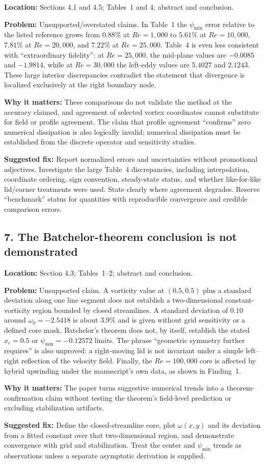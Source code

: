 \documentclass[11pt]{article}
\newcommand{\location}[1]{\textbf{Location:} #1\par}
\newcommand{\problem}[1]{\textbf{Problem:} #1\par}
\newcommand{\impact}[1]{\textbf{Why it matters:} #1\par}
\newcommand{\fixit}[1]{\textbf{Suggested fix:} #1\par}
\begin{document}
\location{Sections 4.1 and 4.5; Tables~1 and 4; abstract and conclusion.}
\problem{Unsupported/overstated claims.  In Table~1 the $\psi_{\min}$ error relative to the listed reference grows from $0.88\%$ at $Re=1{,}000$ to $5.61\%$ at $Re=10{,}000$, $7.81\%$ at $Re=20{,}000$, and $7.22\%$ at $Re=25{,}000$.  Table~4 is even less consistent with ``extraordinary fidelity'': at $Re=25{,}000$, the mid-plane values are $-0.0085$ and $-1.9814$, while at $Re=30{,}000$ the left-eddy values are $5.4027$ and $2.1243$.  These large interior discrepancies contradict the statement that divergence is localized exclusively at the right boundary node.}
\impact{These comparisons do not validate the method at the accuracy claimed, and agreement of selected vortex coordinates cannot substitute for field or profile agreement.  The claim that profile agreement ``confirms'' zero numerical dissipation is also logically invalid; numerical dissipation must be established from the discrete operator and sensitivity studies.}
\fixit{Report normalized errors and uncertainties without promotional adjectives.  Investigate the large Table~4 discrepancies, including interpolation, coordinate ordering, sign convention, steady-state status, and whether like-for-like lid/corner treatments were used.  State clearly where agreement degrades.  Reserve ``benchmark'' status for quantities with reproducible convergence and credible comparison errors.}

\subsection*{7. The Batchelor-theorem conclusion is not demonstrated}

\location{Section 4.3; Tables~1--2; abstract and conclusion.}
\problem{Unsupported claim.  A vorticity value at $(0.5,0.5)$ plus a standard deviation along one line segment does not establish a two-dimensional constant-vorticity region bounded by closed streamlines.  A standard deviation of $0.10$ around $\omega_0=-2.5418$ is about $3.9\%$ and is given without grid sensitivity or a defined core mask.  Batchelor's theorem does not, by itself, establish the stated $x_c=0.5$ or $\psi_{\min}=-0.12572$ limits.  The phrase ``geometric symmetry further requires'' is also unproved: a right-moving lid is not invariant under a simple left--right reflection of the velocity field.  Finally, the $Re=100{,}000$ core is affected by hybrid upwinding under the manuscript's own data, as shown in Finding~1.}
\impact{The paper turns suggestive numerical trends into a theorem-confirmation claim without testing the theorem's field-level prediction or excluding stabilization artifacts.}
\fixit{Define the closed-streamline core, plot $\omega(x,y)$ and its deviation from a fitted constant over that two-dimensional region, and demonstrate convergence with grid and stabilization.  Treat the center and $\psi_{\min}$ trends as observations unless a separate asymptotic derivation is supplied.}
\end{document}
